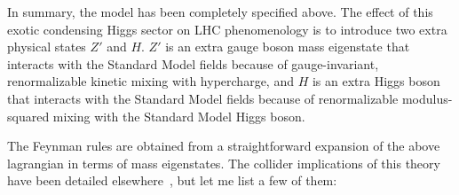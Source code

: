 \documentclass[12pt]{article}
\begin{document}
In summary, the model has been completely specified above. The effect of this exotic condensing Higgs sector on LHC phenomenology is to introduce two extra physical states $Z'$ and $H$.  $Z'$ is an extra gauge boson mass eigenstate that interacts with the Standard Model fields because of gauge-invariant, renormalizable kinetic mixing with hypercharge, and $H$ is an extra Higgs boson that interacts with the Standard Model fields  because of renormalizable modulus-squared mixing with the Standard Model Higgs boson.  



The Feynman rules are obtained from a straightforward expansion of the above lagrangian in terms of mass eigenstates.  The collider implications of this theory have been detailed 
elsewhere~\cite{Schabinger:2005ei,Bowen:2007ia,Wells:2008xg}, but let me list a few of them:
\end{document}
